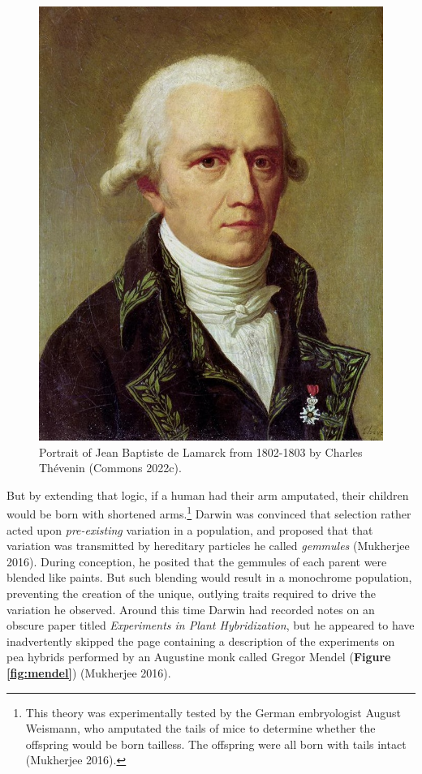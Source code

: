 \documentclass[
]{book}
\begin{document}
\begin{figure}

\includegraphics[width=1\linewidth]{figs/introduction/Jean-Baptiste_de_Lamarck} \hfill{}

\caption{Portrait of Jean Baptiste de Lamarck from 1802-1803 by Charles Thévenin (Commons 2022c).}\label{fig:lamarck}
\end{figure}

But by extending that logic, if a human had their arm amputated, their children would be born with shortened arms.\footnote{This theory was experimentally tested by the German embryologist August Weismann, who amputated the tails of mice to determine whether the offspring would be born tailless. The offspring were all born with tails intact (Mukherjee 2016).} Darwin was convinced that selection rather acted upon \emph{pre-existing} variation in a population, and proposed that that variation was transmitted by hereditary particles he called \emph{gemmules} (Mukherjee 2016). During conception, he posited that the gemmules of each parent were blended like paints. But such blending would result in a monochrome population, preventing the creation of the unique, outlying traits required to drive the variation he observed. Around this time Darwin had recorded notes on an obscure paper titled \emph{Experiments in Plant Hybridization}, but he appeared to have inadvertently skipped the page containing a description of the experiments on pea hybrids performed by an Augustine monk called Gregor Mendel (\textbf{Figure \ref{fig:mendel}}) (Mukherjee 2016).
\end{document}
